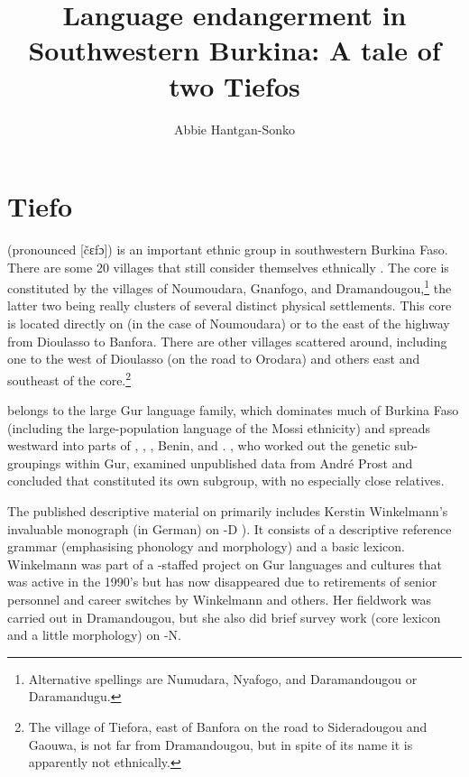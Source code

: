 \documentclass[output=paper,
modfonts
]{langscibook}
\title{Language endangerment in Southwestern Burkina: A tale of two Tiefos}
\author{Abbie Hantgan-Sonko %
}
\begin{document}
 \maketitle
 

 

\section{Tiefo}

 (pronounced [čɛfɔ]) is an important ethnic group in southwestern Burkina Faso. There are some 20 villages that still consider themselves ethnically . The core is constituted by the villages of Noumoudara, Gnanfogo, and Dramandougou,\footnote{Alternative spellings are Numudara, Nyafogo, and Daramandougou or Daramandugu.} the latter two being really clusters of several distinct physical settlements. This core is located directly on (in the case of Noumoudara) or to the east of the highway from  Dioulasso to Banfora. There are other  villages scattered around, including one to the west of  Dioulasso (on the road to Orodara) and others east and southeast of the core.\footnote{The village of Tiefora, east of Banfora on the road to Sideradougou and Gaouwa, is not far from Dramandougou, but in spite of its name it is apparently not  ethnically.}

 belongs to the large Gur language family, which dominates much of Burkina Faso (including the large-population  language of the Mossi ethnicity) and spreads westward into parts of , , , Benin, and . \citet{Manessy1982}, who worked out the genetic sub-groupings within Gur, examined unpublished  data from André Prost and concluded that  constituted its own subgroup, with no especially close relatives.

The published descriptive material on  primarily includes Kerstin Winkelmann’s invaluable monograph (in {German}) on -D \citealt{Winkelmann1998}). It consists of a descriptive reference grammar (emphasising phonology and morphology) and a basic lexicon. Winkelmann was part of a -staffed project on Gur languages and cultures that was active in the 1990’s but has now disappeared due to retirements of senior personnel and career switches by Winkelmann and others. Her fieldwork was carried out in Dramandougou, but she also did brief survey work (core lexicon and a little morphology) on -N.
\end{document}
